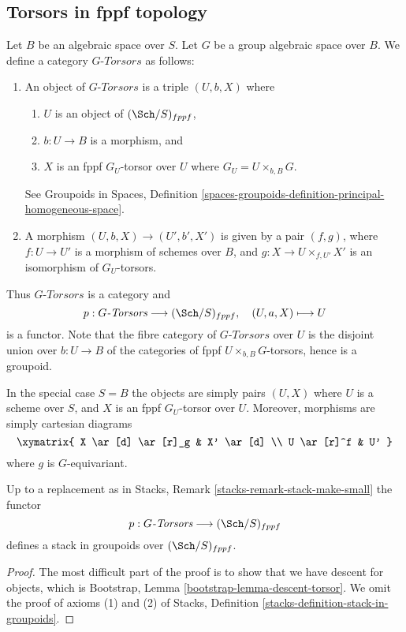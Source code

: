 \subsection{Torsors in fppf topology}
\label{subsection-fppf-torsors}

\noindent
Let $B$ be an algebraic space over $S$.
Let $G$ be a group algebraic space over $B$.
We define a category $G\textit{-Torsors}$ as follows:
\begin{enumerate}
\item An object of $G\textit{-Torsors}$ is a triple $(U, b, X)$ where
\begin{enumerate}
\item $U$ is an object of $(\Sch/S)_{fppf}$,
\item $b : U \to B$ is a morphism, and
\item $X$ is an fppf $G_U$-torsor over $U$ where $G_U = U \times_{b, B} G$.
\end{enumerate}
See
Groupoids in Spaces,
Definition \ref{spaces-groupoids-definition-principal-homogeneous-space}.
\item A morphism $(U, b, X) \to (U', b', X')$ is given
by a pair $(f, g)$, where $f : U \to U'$ is a morphism of schemes
over $B$, and $g : X \to U \times_{f, U'} X'$ is an
isomorphism of $G_U$-torsors.
\end{enumerate}
Thus $G\textit{-Torsors}$ is a category and
$$
p : G\textit{-Torsors} \longrightarrow (\Sch/S)_{fppf},
\quad
(U, a, X) \longmapsto U
$$
is a functor. Note that the fibre category of $G\textit{-Torsors}$
over $U$ is the disjoint union over $b : U \to B$
of the categories of fppf $U \times_{b, B} G$-torsors,
hence is a groupoid.

\medskip\noindent
In the special case $S = B$ the objects are simply pairs
$(U, X)$ where $U$ is a scheme over $S$, and $X$ is an fppf
$G_U$-torsor over $U$. Moreover, morphisms are simply cartesian
diagrams
$$
\xymatrix{
X \ar[d] \ar[r]_g & X' \ar[d] \\
U \ar[r]^f & U'
}
$$
where $g$ is $G$-equivariant.

\begin{lemma}
\label{lemma-torsors-stack-in-groupoids}
Up to a replacement as in
Stacks, Remark \ref{stacks-remark-stack-make-small}
the functor
$$
p : G\textit{-Torsors} \longrightarrow (\Sch/S)_{fppf}
$$
defines a stack in groupoids over $(\Sch/S)_{fppf}$.
\end{lemma}

\begin{proof}
The most difficult part of the proof is to show that we have descent for
objects, which is
Bootstrap, Lemma \ref{bootstrap-lemma-descent-torsor}.
We omit the proof of axioms (1) and (2) of
Stacks, Definition \ref{stacks-definition-stack-in-groupoids}.
\end{proof}

